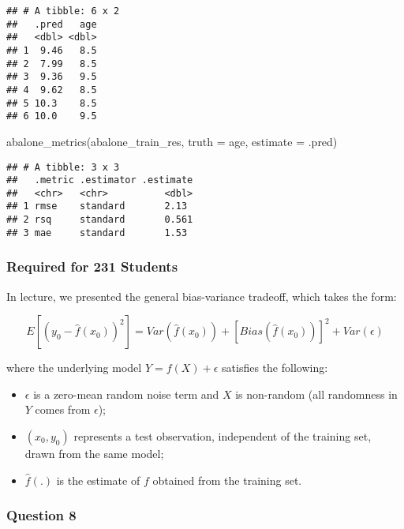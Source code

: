 \documentclass[
]{article}
\newenvironment{Shaded}{\begin{snugshade}}{\end{snugshade}}
\newcommand{\AttributeTok}[1]{\textcolor[rgb]{0.77,0.63,0.00}{#1}}
\newcommand{\FunctionTok}[1]{\textcolor[rgb]{0.00,0.00,0.00}{#1}}
\newcommand{\NormalTok}[1]{#1}
\providecommand{\tightlist}{%
  \setlength{\itemsep}{0pt}\setlength{\parskip}{0pt}}
\begin{document}
\begin{verbatim}
## # A tibble: 6 x 2
##   .pred   age
##   <dbl> <dbl>
## 1  9.46   8.5
## 2  7.99   8.5
## 3  9.36   9.5
## 4  9.62   8.5
## 5 10.3    8.5
## 6 10.0    9.5
\end{verbatim}

\begin{Shaded}
\begin{Highlighting}[]
\FunctionTok{abalone\_metrics}\NormalTok{(abalone\_train\_res, }\AttributeTok{truth =}\NormalTok{ age, }\AttributeTok{estimate =}\NormalTok{ .pred)}
\end{Highlighting}
\end{Shaded}

\begin{verbatim}
## # A tibble: 3 x 3
##   .metric .estimator .estimate
##   <chr>   <chr>          <dbl>
## 1 rmse    standard       2.13 
## 2 rsq     standard       0.561
## 3 mae     standard       1.53
\end{verbatim}

\hypertarget{required-for-231-students}{%
\subsubsection{Required for 231
Students}\label{required-for-231-students}}

In lecture, we presented the general bias-variance tradeoff, which takes
the form:

\[
E[(y_0 - \hat{f}(x_0))^2]=Var(\hat{f}(x_0))+[Bias(\hat{f}(x_0))]^2+Var(\epsilon)
\]

where the underlying model \(Y=f(X)+\epsilon\) satisfies the following:

\begin{itemize}
\tightlist
\item
  \(\epsilon\) is a zero-mean random noise term and \(X\) is non-random
  (all randomness in \(Y\) comes from \(\epsilon\));
\item
  \((x_0, y_0)\) represents a test observation, independent of the
  training set, drawn from the same model;
\item
  \(\hat{f}(.)\) is the estimate of \(f\) obtained from the training
  set.
\end{itemize}

\hypertarget{question-8}{%
\subsubsection{Question 8}\label{question-8}}
\end{document}
